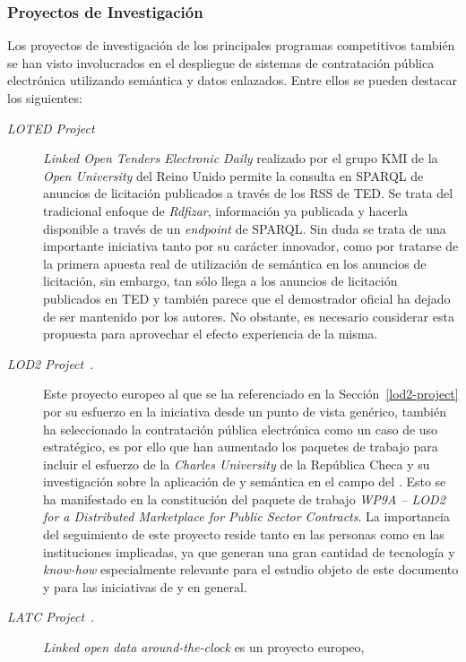 \subsubsection{Proyectos de Investigación}
Los proyectos de investigación de los principales programas competitivos
también se han visto involucrados en el despliegue de sistemas de contratación
pública electrónica utilizando semántica y datos enlazados. Entre ellos
se pueden destacar los siguientes:
\begin{description}
 \item [\textit{LOTED Project}~\cite{loted-project}] \textit{Linked Open Tenders Electronic Daily} realizado
por el grupo KMI de la \textit{Open University} del Reino Unido permite la consulta en \gls{SPARQL} de anuncios de licitación
publicados a través de los \gls{RSS} de \gls{TED}. Se trata del tradicional enfoque de \textit{Rdfizar}, información
ya publicada y hacerla disponible a través de un \textit{endpoint} de SPARQL. Sin duda se trata
de una importante iniciativa tanto por su carácter innovador, como por tratarse de la primera apuesta
real de utilización de semántica en los anuncios de licitación, sin embargo, tan sólo llega a los anuncios
de licitación publicados en TED y también parece que el demostrador oficial ha dejado de ser 
mantenido por los autores. No obstante, es necesario considerar esta propuesta para aprovechar
el efecto experiencia de la misma.
 \item [\textit{LOD2 Project}~\cite{lod2-project}.] Este proyecto europeo al que se ha referenciado en la
Sección~\ref{lod2-project} por su esfuerzo en la iniciativa \linkeddata desde un punto de vista genérico, también ha seleccionado la contratación pública electrónica como un caso de uso estratégico, es por ello
que han aumentado los paquetes de trabajo para incluir el esfuerzo de la \textit{Charles University} de la República Checa y su investigación sobre la aplicación de \linkeddata y semántica en el campo
del \eproc. Esto se ha manifestado en la constitución del paquete de trabajo \textit{WP9A – LOD2 for a Distributed Marketplace for Public Sector Contracts}.
La importancia del seguimiento de este proyecto reside tanto en las personas como en las instituciones implicadas, ya que generan 
una gran cantidad de tecnología y \textit{know-how} especialmente relevante para el estudio objeto de este documento y para las iniciativas
de \linkeddata y \opendata en general.
 \item [\textit{LATC Project}~\cite{latc-project}.] \textit{Linked open data around-the-clock} es un proyecto europeo,

\end{description}
